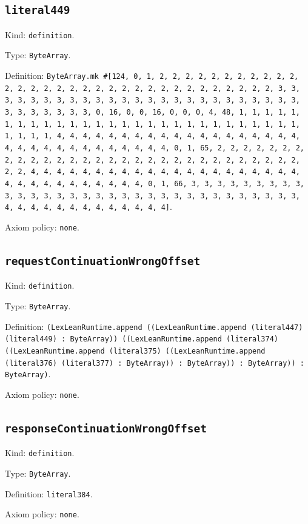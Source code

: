 \documentclass[11pt]{article}
\begin{document}
\subsection*{\texttt{literal449}}
\noindent Kind: \texttt{definition}.\par
\noindent Type: \texttt{ByteArray}.\par
\noindent Definition: \texttt{ByteArray.mk \#[124, 0, 1, 2, 2, 2, 2, 2, 2, 2, 2, 2, 2, 2, 2, 2, 2, 2, 2, 2, 2, 2, 2, 2, 2, 2, 2, 2, 2, 2, 2, 2, 2, 2, 2, 3, 3, 3, 3, 3, 3, 3, 3, 3, 3, 3, 3, 3, 3, 3, 3, 3, 3, 3, 3, 3, 3, 3, 3, 3, 3, 3, 3, 3, 3, 3, 3, 0, 16, 0, 0, 16, 0, 0, 0, 4, 48, 1, 1, 1, 1, 1, 1, 1, 1, 1, 1, 1, 1, 1, 1, 1, 1, 1, 1, 1, 1, 1, 1, 1, 1, 1, 1, 1, 1, 1, 1, 1, 1, 4, 4, 4, 4, 4, 4, 4, 4, 4, 4, 4, 4, 4, 4, 4, 4, 4, 4, 4, 4, 4, 4, 4, 4, 4, 4, 4, 4, 4, 4, 4, 4, 0, 1, 65, 2, 2, 2, 2, 2, 2, 2, 2, 2, 2, 2, 2, 2, 2, 2, 2, 2, 2, 2, 2, 2, 2, 2, 2, 2, 2, 2, 2, 2, 2, 2, 2, 4, 4, 4, 4, 4, 4, 4, 4, 4, 4, 4, 4, 4, 4, 4, 4, 4, 4, 4, 4, 4, 4, 4, 4, 4, 4, 4, 4, 4, 4, 4, 4, 0, 1, 66, 3, 3, 3, 3, 3, 3, 3, 3, 3, 3, 3, 3, 3, 3, 3, 3, 3, 3, 3, 3, 3, 3, 3, 3, 3, 3, 3, 3, 3, 3, 3, 3, 4, 4, 4, 4, 4, 4, 4, 4, 4, 4, 4, 4, 4]}.\par
\noindent Axiom policy: \texttt{none}.\par
\subsection*{\texttt{requestContinuationWrongOffset}}
\noindent Kind: \texttt{definition}.\par
\noindent Type: \texttt{ByteArray}.\par
\noindent Definition: \texttt{(LexLeanRuntime.append ((LexLeanRuntime.append (literal447) (literal449) : ByteArray)) ((LexLeanRuntime.append (literal374) ((LexLeanRuntime.append (literal375) ((LexLeanRuntime.append (literal376) (literal377) : ByteArray)) : ByteArray)) : ByteArray)) : ByteArray)}.\par
\noindent Axiom policy: \texttt{none}.\par
\subsection*{\texttt{responseContinuationWrongOffset}}
\noindent Kind: \texttt{definition}.\par
\noindent Type: \texttt{ByteArray}.\par
\noindent Definition: \texttt{literal384}.\par
\noindent Axiom policy: \texttt{none}.\par
\end{document}
